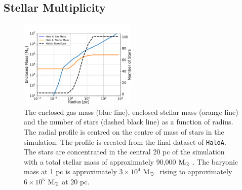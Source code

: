 \documentclass[twocolumn,iop,revtex4]{openjournal}
\newcommand{\msolar} {$\rm{M_{\odot}}~$}
\newcommand{\hac} {\texttt{HaloA}}
\begin{document}
\subsection{Stellar Multiplicity}
\begin{figure}
   \centering 
\includegraphics[width=0.5\textwidth]{FIGURES/EnclosedMass.pdf}
\caption{The enclosed gas mass (blue line), enclosed stellar mass (orange line) and the number of
stars (dashed black line) as a function of radius. The radial profile is centred on the centre
of mass of stars in the simulation. The profile is created from the final dataset of \hac.
The stars are concentrated in the central 20 pc of the simulation with a total stellar mass of
approximately 90,000 \msolar. The baryonic mass at 1 pc is approximately $3 \times 10^4$ \msolar
rising to approximately $6 \times 10^5$ \msolar at 20 pc. }
\label{Fig:EnclosedMass}
\end{figure}
\end{document}
